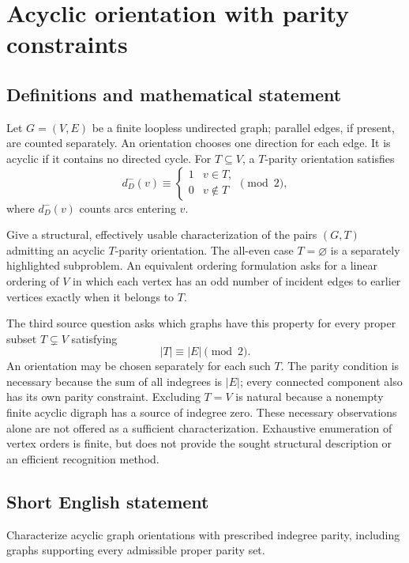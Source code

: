 \documentclass[11pt,a4paper]{article}
\begin{document}
\section*{Acyclic orientation with parity constraints}\label{statement}

\subsection{Definitions and mathematical statement}
Let $G=(V,E)$ be a finite loopless undirected graph; parallel edges,
if present, are counted separately. An orientation chooses one direction
for each edge. It is acyclic if it contains no directed cycle.
For $T\subseteq V$, a $T$-parity orientation satisfies
\[
 d_D^-(v)\equiv\begin{cases}1&v\in T,\\0&v\notin T\end{cases}
                       \pmod2,
\]
where $d_D^-(v)$ counts arcs entering $v$.

Give a structural, effectively usable characterization of the pairs
$(G,T)$ admitting an acyclic $T$-parity orientation. The all-even case
$T=\varnothing$ is a separately highlighted subproblem. An equivalent
ordering formulation asks for a linear ordering of $V$ in which each
vertex has an odd number of incident edges to earlier vertices exactly
when it belongs to $T$.

The third source question asks which graphs have this property for
every proper subset $T\subsetneq V$ satisfying
\[
                         |T|\equiv|E|\pmod2.
\]
An orientation may be chosen separately for each such $T$.
The parity condition is necessary because the sum of all indegrees is
$|E|$; every connected component also has its own parity constraint.
Excluding $T=V$ is natural because a nonempty finite acyclic digraph
has a source of indegree zero. These necessary observations alone are
not offered as a sufficient characterization. Exhaustive enumeration
of vertex orders is finite, but does not provide the sought structural
description or an efficient recognition method.
\subsection{Short English statement}
Characterize acyclic graph orientations with prescribed indegree parity, including graphs supporting every admissible proper parity set.
\end{document}
